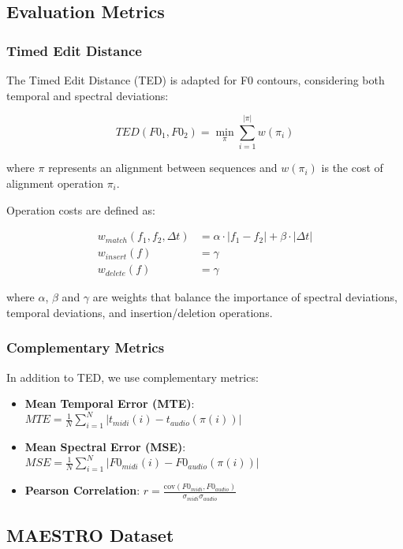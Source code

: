 \documentclass[12pt,a4paper]{article}
\begin{document}
\subsection{Evaluation Metrics}

\subsubsection{Timed Edit Distance}

The Timed Edit Distance (TED) is adapted for F0 contours, considering both temporal and spectral deviations:

\begin{equation}
TED(F0_1, F0_2) = \min_{\pi} \sum_{i=1}^{|\pi|} w(\pi_i)
\end{equation}

where $\pi$ represents an alignment between sequences and $w(\pi_i)$ is the cost of alignment operation $\pi_i$.

Operation costs are defined as:

\begin{align}
w_{match}(f_1, f_2, \Delta t) &= \alpha \cdot |f_1 - f_2| + \beta \cdot |\Delta t| \\
w_{insert}(f) &= \gamma \\
w_{delete}(f) &= \gamma
\end{align}

where $\alpha$, $\beta$ and $\gamma$ are weights that balance the importance of spectral deviations, temporal deviations, and insertion/deletion operations.

\subsubsection{Complementary Metrics}

In addition to TED, we use complementary metrics:

\begin{itemize}
    \item \textbf{Mean Temporal Error (MTE)}: $MTE = \frac{1}{N} \sum_{i=1}^{N} |t_{midi}(i) - t_{audio}(\pi(i))|$
    \item \textbf{Mean Spectral Error (MSE)}: $MSE = \frac{1}{N} \sum_{i=1}^{N} |F0_{midi}(i) - F0_{audio}(\pi(i))|$
    \item \textbf{Pearson Correlation}: $r = \frac{\text{cov}(F0_{midi}, F0_{audio})}{\sigma_{midi} \sigma_{audio}}$
\end{itemize}

\subsection{MAESTRO Dataset}
\end{document}
